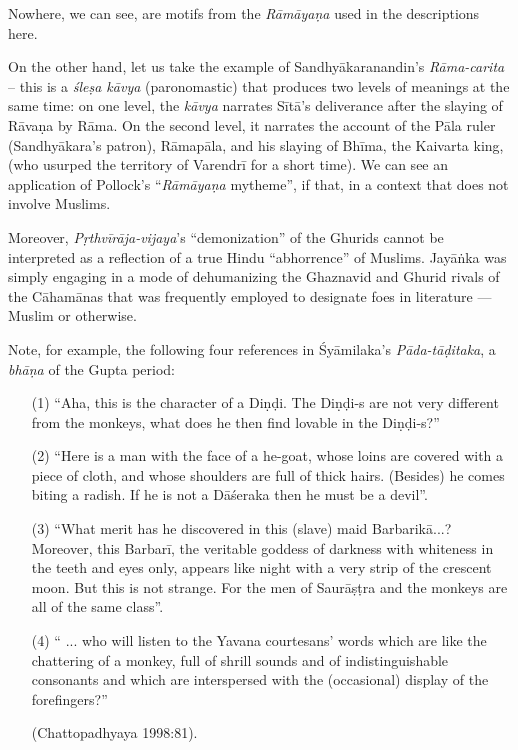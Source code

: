 Nowhere, we can see, are motifs from the {\sl Rāmāyaṇa} used in the descriptions here.  

On the other hand, let us take the example of Sandhyākaranandin's {\sl Rāma-carita} – this is a {\sl śleṣa kāvya} (paronomastic) that produces two levels of meanings at the same time: on one level, the {\sl kāvya} narrates Sītā’s deliverance after the slaying of Rāvaṇa by Rāma.  On the second level, it narrates the account of the Pāla ruler (Sandhyākara’s patron), Rāmapāla, and his slaying of Bhīma, the Kaivarta king, (who usurped the territory of Varendrī for a short time). We can see an application of Pollock’s “{\sl Rāmāyaṇa} mytheme”, if that, in a context that does not involve Muslims. 

Moreover, {\sl Pṛthvīrāja-vijaya}’s “demonization” of the Ghurids cannot be interpreted as a reflection of a true Hindu “abhorrence” of Muslims. Jayāṅka was simply engaging in a mode of dehumanizing the Ghaznavid and Ghurid rivals of the Cāhamānas that was frequently employed to designate foes in literature — Muslim or otherwise. 

Note, for example, the following four references in Śyāmilaka’s {\sl Pāda-tāḍitaka}, a {\sl bhāṇa} of the Gupta period: 
\begin{itemize}
\item[(1)] “Aha, this is the character of a Diṇḍi. The Diṇḍi-s are not very different from the monkeys, what does he then find lovable in the Diṇḍi-s?”

\item[(2)] “Here is a man with the face of a he-goat, whose loins are covered with a piece of cloth, and whose shoulders are full of thick hairs. (Besides) he comes biting a radish. If he is not a Dāśeraka then he must be a devil”. 

\item[(3)] “What merit has he discovered in this (slave) maid Barbarikā...? Moreover, this Barbarī, the veritable goddess of darkness with whiteness in the teeth and eyes only, appears like night with a very strip of the crescent moon. But this is not strange. For the men of Saurāṣṭra and the monkeys are all of the same class”. 

\item[(4)] “ ... who will listen to the Yavana courtesans’ words which are like the chattering of a monkey, full of shrill sounds and of indistinguishable consonants and which are interspersed with the (occasional) display of the forefingers?” 

\hfill (Chattopadhyaya 1998:81). 
\end{itemize}

